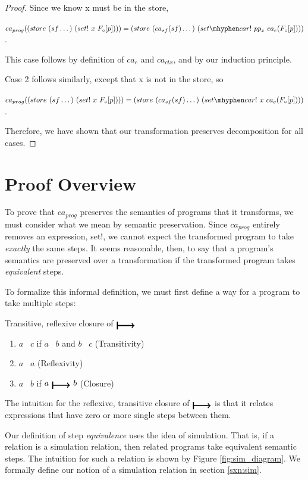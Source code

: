 \begin{proof}
Since we know x must be in the store, 

$ca_{prog}((store\ (sf \dots)\ (set!\ x\ F_{\circ}[p]))) = (store\ (ca_{sf}(sf) \dots)\ (set \mhyphen car!\ pp_x\ ca_{e}(F_{\circ}[p])))$. 

This case follows by definition of $ca_{e}$ and $ca_{ctx}$, and by our induction principle.

Case 2 follows similarly, except that x is not in the store, so 

$ca_{prog}((store\ (sf \dots)\ (set!\ x\ F_{\circ}[p]))) = (store\ (ca_{sf}(sf) \dots)\ (set \mhyphen car!\ x\ ca_{e}(F_{\circ}[p])))$. 

Therefore, we have shown that our transformation preserves decomposition for all cases.
\end{proof}








\newpage
\section{Proof Overview}
To prove that $ca_{prog}$ preserves the semantics of programs that it transforms, we must consider what we mean by semantic preservation. Since $ca_{prog}$ entirely removes an expression, set!, we cannot expect the transformed program to take \textit{exactly} the same steps. It seems reasonable, then, to say that a program's semantics are preserved over a transformation if the transformed program takes \textit{equivalent} steps. 

To formalize this informal definition, we must first define a way for a program to take multiple steps:
\begin{definition}
Transitive, reflexive closure of $\step$
\begin{enumerate}
    \item $a$ \trstep\ $c$ if $a$ \trstep\ $b$ and $b$ \trstep\ $c$ (Transitivity)
    \item $a$ \trstep\ $a$ (Reflexivity)
    \item $a$ \trstep\ $b$ if $a\ \step\ b$ (Closure)
\end{enumerate}
\end{definition}

The intuition for the reflexive, transitive closure of $\step$ is that it relates expressions that have zero or more single steps between them.

Our definition of step \textit{equivalence} uses the idea of simulation. That is, if a relation is a simulation relation, then related programs take equivalent semantic steps. The intuition for such a relation is shown by Figure \ref{fig:sim_diagram}. We formally define our notion of a simulation relation in section \ref{sxn:sim}.


